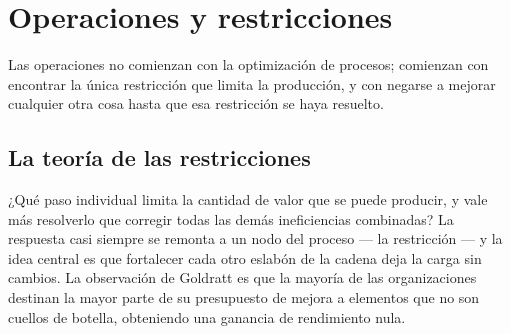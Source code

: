 \chapter{Operaciones y restricciones}\label{ch:operations}


Las operaciones no comienzan con la optimización de procesos; comienzan con encontrar la única restricción que limita la producción, y con negarse a mejorar cualquier otra cosa hasta que esa restricción se haya resuelto.

\section{La teoría de las restricciones}\label{sec:toc}

¿Qué paso individual limita la cantidad de valor que se puede producir, y vale más resolverlo que corregir todas las demás ineficiencias combinadas? La respuesta casi siempre se remonta a un nodo del proceso --- la restricción --- y la idea central es que fortalecer cada otro eslabón de la cadena deja la carga sin cambios. La observación de Goldratt es que la mayoría de las organizaciones destinan la mayor parte de su presupuesto de mejora a elementos que no son cuellos de botella, obteniendo una ganancia de rendimiento nula.

